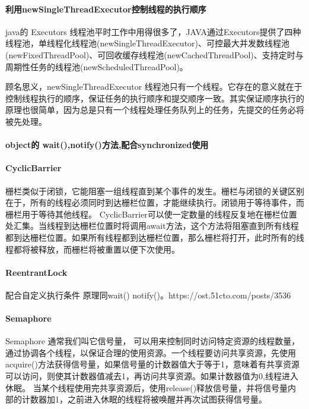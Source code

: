 \documentclass[../../../interview-questions.tex]{subfiles}
\begin{document}
\paragraph{利用newSingleThreadExecutor控制线程的执行顺序}

java的 Executors 线程池平时工作中用得很多了，JAVA通过Executors提供了四种线程池，单线程化线程池(newSingleThreadExecutor)、可控最大并发数线程池(newFixedThreadPool)、可回收缓存线程池(newCachedThreadPool)、支持定时与周期性任务的线程池(newScheduledThreadPool)。

顾名思义，newSingleThreadExecutor 线程池只有一个线程。它存在的意义就在于控制线程执行的顺序，保证任务的执行顺序和提交顺序一致。其实保证顺序执行的原理也很简单，因为总是只有一个线程处理任务队列上的任务，先提交的任务必将被先处理。

\paragraph{object的 wait(),notify()方法,配合synchronized使用}

\paragraph{CyclicBarrier}

栅栏类似于闭锁，它能阻塞一组线程直到某个事件的发生。栅栏与闭锁的关键区别在于，所有的线程必须同时到达栅栏位置，才能继续执行。闭锁用于等待事件，而栅栏用于等待其他线程。 CyclicBarrier可以使一定数量的线程反复地在栅栏位置处汇集。当线程到达栅栏位置时将调用await方法，这个方法将阻塞直到所有线程都到达栅栏位置。如果所有线程都到达栅栏位置，那么栅栏将打开，此时所有的线程都将被释放，而栅栏将被重置以便下次使用。

\paragraph{ReentrantLock}

配合自定义执行条件 原理同wait() notify()。https://ost.51cto.com/posts/3536

\paragraph{Semaphore}

Semaphore 通常我们叫它信号量， 可以用来控制同时访问特定资源的线程数量，通过协调各个线程，以保证合理的使用资源。一个线程要访问共享资源，先使用acquire()方法获得信号量，如果信号量的计数器值大于等于1，意味着有共享资源可以访问，则使其计数器值减去1，再访问共享资源。如果计数器值为0,线程进入休眠。
当某个线程使用完共享资源后，使用release()释放信号量，并将信号量内部的计数器加1，之前进入休眠的线程将被唤醒并再次试图获得信号量。
\end{document}
